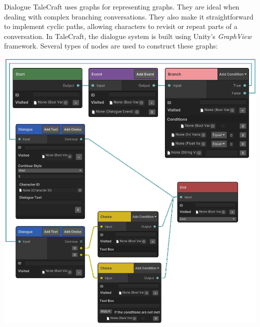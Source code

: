 \documentclass[portrait,a0paper,fontscale=0.34]{baposter}
\begin{document}
\begin{poster}
\begin{posterbox}[column=1, span=1, name=ds, below=is, %
]{Dialogue}
TaleCraft uses graphs for representing graphs. They are ideal when dealing with complex branching conversations. They also make it straightforward to implement cyclic paths, allowing characters to revisit or repeat parts of a conversation. In TaleCraft, the dialogue system is built using Unity’s \textit{GraphView} framework. Several types of nodes are used to construct these graphs: 

\begin{center}
\includegraphics[width=0.7\linewidth]{img/nodes.png}
\end{center}

\end{posterbox}



\end{poster}
\end{document}
